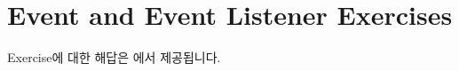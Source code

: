 \section{Event and Event Listener Exercises}\label{sect:event-and-event-listener-exercises}



Exercise에 대한 해답은 에서 제공됩니다.
